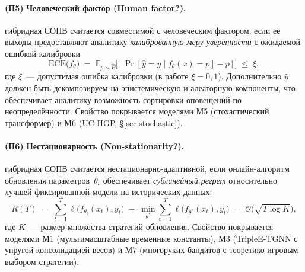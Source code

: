 \paragraph{(П5) Человеческий фактор (Human factor?).}
гибридная СОПВ считается совместимой с человеческим фактором, если её
выходы предоставляют аналитику \emph{калиброванную меру уверенности}
с ожидаемой ошибкой калибровки
\begin{equation}
\mathrm{ECE}\bigl(f_\theta\bigr)
\;=\;
\mathbb{E}_{p\sim\hat{P}}\bigl[\,
\bigl|\,\Pr[\hat{y}=y\mid f_\theta(x)=p]-p\,\bigr|
\,\bigr]
\;\le\; \xi,
\label{eq:calibration_property}
\end{equation}
где $\xi$~--- допустимая ошибка калибровки (в работе $\xi=0{,}1$).
Дополнительно $\hat{y}$ должен быть декомпозируем на эпистемическую
и алеаторную компоненты, что обеспечивает аналитику возможность
сортировки оповещений по неопределённости. Свойство покрывается
моделями М5 (стохастический трансформер) и М6 (UC-HGP,
\S\ref{sec:stochastic}).

\paragraph{(П6) Нестационарность (Non-stationarity?).}
гибридная СОПВ считается нестационарно-адаптивной, если онлайн-алгоритм
обновления параметров~$\theta_t$ обеспечивает \emph{сублинейный
регрет} относительно лучшей фиксированной модели на исторических
данных:
\begin{equation}
R(T) \;=\; \sum_{t=1}^{T} \ell\bigl(f_{\theta_t}(x_t), y_t\bigr)
\;-\;\min_{\theta^{*}} \sum_{t=1}^{T} \ell\bigl(f_{\theta^{*}}(x_t),
y_t\bigr) \;=\; \mathcal{O}\bigl(\sqrt{T\log K}\bigr),
\label{eq:nonstationarity_property}
\end{equation}
где $K$~--- размер множества стратегий обновления. Свойство покрывается
моделями М1 (мультимасштабные временные константы), М3
(\textsf{TripleE-TGNN} с упругой консолидацией весов) и М7
(многоруких бандитов с теоретико-игровым выбором стратегии).

